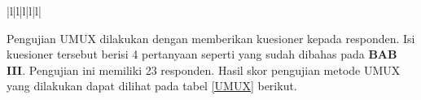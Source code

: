 \begin{table}[H]
\begin{tabular}{|l|l|l|l|l|}
		                                                                                                                                                                                                                                                                                                  \\ \hline
	\end{tabular}
\end{table}

\par Pengujian UMUX dilakukan dengan memberikan kuesioner kepada responden. Isi kuesioner tersebut berisi 4 pertanyaan seperti yang sudah dibahas pada \textbf{BAB III}. Pengujian ini memiliki 23 responden. Hasil skor pengujian metode UMUX yang dilakukan dapat dilihat pada tabel \ref{UMUX} berikut.

